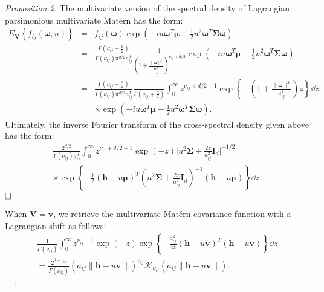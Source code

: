 \documentclass[12pt]{article}
\newcommand{\0}{\mathbf{0}}
\newtheorem{proof}{Proof}
\begin{document}
\begin{proof}[Proposition 2]
\begingroup
\allowdisplaybreaks
The multivariate version of the spectral density of Lagrangian parsimonious multivariate Mat\'{e}rn has the form:
\begin{eqnarray}
E_{\mathbf{V}}\left\{f_{ij}(\boldsymbol{\omega},u)\right\} &=&  f_{ij}(\boldsymbol{\omega}) \exp\left(-iu\boldsymbol{\omega}^T\boldsymbol{\mu}-\frac{1}{2}u^2\boldsymbol{\omega}^T\boldsymbol{\Sigma}\boldsymbol{\omega}\right) \nonumber\\
&=&\frac{\Gamma\left(\nu_{ij}+\frac{d}{2}\right)}{\Gamma\left(\nu_{ij}\right)\pi^{d/2}a_{ij}^{d}} \frac{1}{\left(1+\frac{\|\boldsymbol{\omega}\|^2}{a_{ij}^2}\right)^{\nu_{ij}+d/2}} \exp\left(-iu\boldsymbol{\omega}^T\boldsymbol{\mu}-\frac{1}{2}u^2\boldsymbol{\omega}^T\boldsymbol{\Sigma}\boldsymbol{\omega}\right)  \nonumber\\
&=&\frac{\Gamma\left(\nu_{ij}+\frac{d}{2}\right)}{\Gamma\left(\nu_{ij}\right)\pi^{d/2}a_{ij}^{d}}\frac{1}{\Gamma\left(\nu_{ij}+\frac{d}{2}\right)}\int_0^{\infty}z^{\nu_{ij}+d/2-1} \exp\left\{-\left(1+\frac{ \|\boldsymbol{\omega}\|^2}{a_{ij}^2}\right)z\right\}\dd z  \nonumber \\
&&\times \exp\left(-iu\boldsymbol{\omega}^T\boldsymbol{\mu}-\frac{1}{2}u^2\boldsymbol{\omega}^T\boldsymbol{\Sigma}\boldsymbol{\omega}\right). \nonumber
\end{eqnarray}
Ultimately, the inverse Fourier transform of the cross-spectral density given above has the form:
\begin{multline*}
\frac{2^{d/2}}{\Gamma\left(\nu_{ij}\right)a_{ij}^d}\int_0^{\infty}z^{\nu_{ij}+d/2-1} \exp\left(-z\right)\Big|u^2\boldsymbol{\Sigma}+\frac{2z}{a_{ij}^2}\mathbf{I}_{d}\Big|^{-1/2}\\
 \times\exp\left\{-\frac{1}{2}(\mathbf{h}-u\boldsymbol{\mu})^T\left(u^2\boldsymbol{\Sigma}+\frac{2z}{a_{ij}^2}\mathbf{I}_{d}\right)^{-1}(\mathbf{h}-u\boldsymbol{\mu})\right\}\dd z.
\end{multline*}
$\hfill \Box$

When $\mathbf{V}=\mathbf{v}$, we retrieve the multivariate Mat\'{e}rn covariance function with a Lagrangian shift as follows:
\begin{eqnarray*}
\frac{1}{\Gamma\left(\nu_{ij}\right)} \int_0^{\infty}z^{\nu_{ij}-1} \exp\left(-z\right) \exp\left\{-\frac{a_{ij}^2}{4z}(\mathbf{h}-u\mathbf{v})^T(\mathbf{h}-u\mathbf{v})\right\}\dd z\\
=\frac{2^{1-\nu_{ij}}}{\Gamma\left(\nu_{ij}\right)}   \left(a_{ij}\|\mathbf{h}-u\mathbf{v}\|\right)^{\nu_{ij}}\mathcal{K}_{\nu_{ij}}\left(a_{ij}\|\mathbf{h}-u\mathbf{v}\|\right). 
\end{eqnarray*}

\end{proof}
\endgroup

\baselineskip=20pt
%


\end{document}
